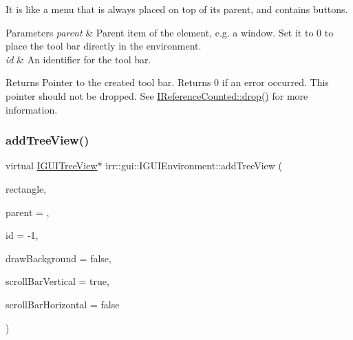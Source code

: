 It is like a menu that is always placed on top of its parent, and contains buttons. 
\begin{DoxyParams}{Parameters}
{\em parent} & Parent item of the element, e.\+g. a window. Set it to 0 to place the tool bar directly in the environment. \\
\hline
{\em id} & An identifier for the tool bar. \\
\hline
\end{DoxyParams}
\begin{DoxyReturn}{Returns}
Pointer to the created tool bar. Returns 0 if an error occurred. This pointer should not be dropped. See \hyperlink{classirr_1_1IReferenceCounted_a03856a09355b89d178090c4a5f738543}{I\+Reference\+Counted\+::drop()} for more information. 
\end{DoxyReturn}
\mbox{\label{classirr_1_1gui_1_1IGUIEnvironment_a3c82300cf7eaabc451ef20a04b432c32}} 
\subsubsection{\texorpdfstring{add\+Tree\+View()}{addTreeView()}}
{\footnotesize\ttfamily virtual \hyperlink{classirr_1_1gui_1_1IGUITreeView}{I\+G\+U\+I\+Tree\+View}$\ast$ irr\+::gui\+::\+I\+G\+U\+I\+Environment\+::add\+Tree\+View (\begin{DoxyParamCaption}\item[{const \hyperlink{classirr_1_1core_1_1rect}{core\+::rect}$<$ \hyperlink{namespaceirr_ac66849b7a6ed16e30ebede579f9b47c6}{s32} $>$ \&}]{rectangle,  }\item[{\hyperlink{classirr_1_1gui_1_1IGUIElement}{I\+G\+U\+I\+Element} $\ast$}]{parent = {},  }\item[{\hyperlink{namespaceirr_ac66849b7a6ed16e30ebede579f9b47c6}{s32}}]{id = {\ttfamily -\/1},  }\item[{bool}]{draw\+Background = {\ttfamily false},  }\item[{bool}]{scroll\+Bar\+Vertical = {\ttfamily true},  }\item[{bool}]{scroll\+Bar\+Horizontal = {\ttfamily false} }\end{DoxyParamCaption})\hspace{0.3cm}{\ttfamily [pure virtual]}}



